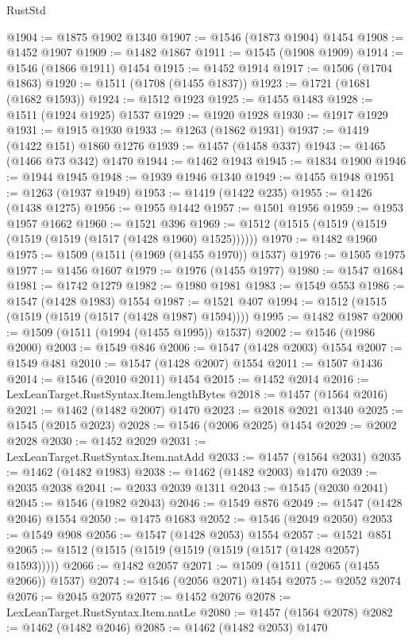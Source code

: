 \begin{lexlean}{RustStd}
\begin{coremodule}
{\begin{coremodule}
{{{{{{{{{{{{{{{{{{{{{{{{{{{{{{@1904 := @1875 @1902 @1340
@1907 := @1546 (@1873 @1904) @1454
@1908 := @1452 @1907
@1909 := @1482 @1867
@1911 := @1545 (@1908 @1909)
@1914 := @1546 (@1866 @1911) @1454
@1915 := @1452 @1914
@1917 := @1506 (@1704 @1863)
@1920 := @1511 (@1708 (@1455 @1837))
@1923 := @1721 (@1681 (@1682 @1593))
@1924 := @1512 @1923
@1925 := @1455 @1483
@1928 := @1511 (@1924 @1925) @1537
@1929 := @1920 @1928
@1930 := @1917 @1929
@1931 := @1915 @1930
@1933 := @1263 (@1862 @1931)
@1937 := @1419 (@1422 @151) @1860 @1276
@1939 := @1457 (@1458 @337)
@1943 := @1465 (@1466 @73 @342) @1470
@1944 := @1462 @1943
@1945 := @1834 @1900
@1946 := @1944 @1945
@1948 := @1939 @1946 @1340
@1949 := @1455 @1948
@1951 := @1263 (@1937 @1949)
@1953 := @1419 (@1422 @235)
@1955 := @1426 (@1438 @1275)
@1956 := @1955 @1442
@1957 := @1501 @1956
@1959 := @1953 @1957 @1662
@1960 := @1521 @396
@1969 := @1512 (@1515 (@1519 (@1519 (@1519 (@1519 (@1517 (@1428 @1960) @1525))))))
@1970 := @1482 @1960
@1975 := @1509 (@1511 (@1969 (@1455 @1970)) @1537)
@1976 := @1505 @1975
@1977 := @1456 @1607
@1979 := @1976 (@1455 @1977)
@1980 := @1547 @1684
@1981 := @1742 @1279
@1982 := @1980 @1981
@1983 := @1549 @553
@1986 := @1547 (@1428 @1983) @1554
@1987 := @1521 @407
@1994 := @1512 (@1515 (@1519 (@1519 (@1517 (@1428 @1987) @1594))))
@1995 := @1482 @1987
@2000 := @1509 (@1511 (@1994 (@1455 @1995)) @1537)
@2002 := @1546 (@1986 @2000)
@2003 := @1549 @846
@2006 := @1547 (@1428 @2003) @1554
@2007 := @1549 @481
@2010 := @1547 (@1428 @2007) @1554
@2011 := @1507 @1436
@2014 := @1546 (@2010 @2011) @1454
@2015 := @1452 @2014
@2016 := LexLeanTarget.RustSyntax.Item.lengthBytes
@2018 := @1457 (@1564 @2016)
@2021 := @1462 (@1482 @2007) @1470
@2023 := @2018 @2021 @1340
@2025 := @1545 (@2015 @2023)
@2028 := @1546 (@2006 @2025) @1454
@2029 := @2002 @2028
@2030 := @1452 @2029
@2031 := LexLeanTarget.RustSyntax.Item.natAdd
@2033 := @1457 (@1564 @2031)
@2035 := @1462 (@1482 @1983)
@2038 := @1462 (@1482 @2003) @1470
@2039 := @2035 @2038
@2041 := @2033 @2039 @1311
@2043 := @1545 (@2030 @2041)
@2045 := @1546 (@1982 @2043)
@2046 := @1549 @876
@2049 := @1547 (@1428 @2046) @1554
@2050 := @1475 @1683
@2052 := @1546 (@2049 @2050)
@2053 := @1549 @908
@2056 := @1547 (@1428 @2053) @1554
@2057 := @1521 @851
@2065 := @1512 (@1515 (@1519 (@1519 (@1519 (@1517 (@1428 @2057) @1593)))))
@2066 := @1482 @2057
@2071 := @1509 (@1511 (@2065 (@1455 @2066)) @1537)
@2074 := @1546 (@2056 @2071) @1454
@2075 := @2052 @2074
@2076 := @2045 @2075
@2077 := @1452 @2076
@2078 := LexLeanTarget.RustSyntax.Item.natLe
@2080 := @1457 (@1564 @2078)
@2082 := @1462 (@1482 @2046)
@2085 := @1462 (@1482 @2053) @1470
}}}}}}}}}}}}}}}}}}}}}}}}}}}}}}
\end{coremodule}}
\end{coremodule}
\end{lexlean}
